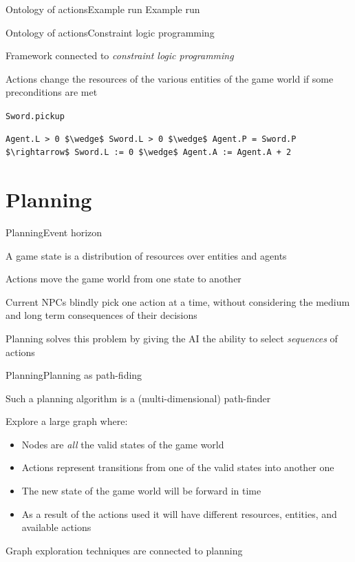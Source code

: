 \documentclass{beamer}
\begin{document}
\begin{textslide}{Ontology of actions}{Example run}{
Example run
}\end{textslide}

\begin{slide}{Ontology of actions}{Constraint logic programming}{
\item Framework connected to \textit{constraint logic programming} \cite{CONSTRAINT_PROGRAMMING}
\item Actions change the resources of the various entities of the game world if some preconditions are met
}\end{slide}

\begin{frame}[fragile]{\texttt{Sword.pickup}}
\begin{lstlisting}
Agent.L > 0 $\wedge$ Sword.L > 0 $\wedge$ Agent.P = Sword.P $\rightarrow$ Sword.L := 0 $\wedge$ Agent.A := Agent.A + 2
\end{lstlisting}
\end{frame}


\section{Planning}
\begin{slide}{Planning}{Event horizon}{
\item A game state is a distribution of resources over entities and agents
\item Actions move the game world from one state to another
\item Current NPCs blindly pick one action at a time, without considering the medium and long term consequences of their decisions
\item Planning solves this problem by giving the AI the ability to select \textit{sequences} of actions
}\end{slide}

\begin{slide}{Planning}{Planning as path-fiding}{
\item Such a planning algorithm is a (multi-dimensional) path-finder
\item Explore a large graph where:
\begin{itemize}
\item Nodes are \textit{all} the valid states of the game world
\item Actions represent transitions from one of the valid states into another one
\item The new state of the game world will be forward in time
\item As a result of the actions used it will have different resources, entities, and available actions
\end{itemize}
\item Graph exploration techniques are connected to planning \cite{STATE_SPACE_SEARCH}
}\end{slide}
\end{document}
